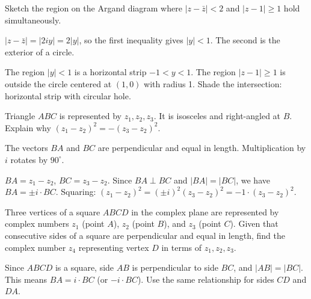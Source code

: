 \begin{problem}
Sketch the region on the Argand diagram where $|z - \bar{z}| < 2$ and $|z-1| \ge 1$ hold simultaneously.
\end{problem}

\begin{hint}
$|z - \bar{z}| = |2iy| = 2|y|$, so the first inequality gives $|y| < 1$. The second is the exterior of a circle.
\end{hint}

\begin{solution}[Sketch]
The region $|y| < 1$ is a horizontal strip $-1 < y < 1$. The region $|z-1| \ge 1$ is outside the circle centered at $(1,0)$ with radius 1. Shade the intersection: horizontal strip with circular hole.
\end{solution}

\begin{problem}
Triangle $ABC$ is represented by $z_1, z_2, z_3$. It is isosceles and right-angled at $B$. Explain why $(z_1 - z_2)^2 = -(z_3 - z_2)^2$.
\end{problem}

\begin{hint}
The vectors $BA$ and $BC$ are perpendicular and equal in length. Multiplication by $i$ rotates by $90^\circ$.
\end{hint}

\begin{solution}[Sketch]
$BA = z_1-z_2$, $BC = z_3-z_2$. Since $BA \perp BC$ and $|BA|=|BC|$, we have $BA = \pm i \cdot BC$. Squaring: $(z_1-z_2)^2 = (\pm i)^2(z_3-z_2)^2 = -1 \cdot (z_3-z_2)^2$.
\end{solution}

\begin{problem}
Three vertices of a square $ABCD$ in the complex plane are represented by complex numbers $z_1$ (point $A$), $z_2$ (point $B$), and $z_3$ (point $C$). Given that consecutive sides of a square are perpendicular and equal in length, find the complex number $z_4$ representing vertex $D$ in terms of $z_1, z_2, z_3$.
\end{problem}

\begin{hint}
Since $ABCD$ is a square, side $AB$ is perpendicular to side $BC$, and $|AB| = |BC|$. This means $BA = i \cdot BC$ (or $-i \cdot BC$). Use the same relationship for sides $CD$ and $DA$.
\end{hint}

